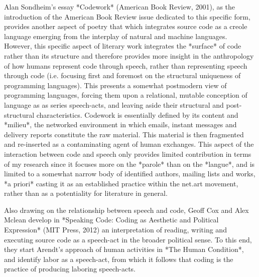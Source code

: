 Alan Sondheim's essay *Codework* (American Book Review, 2001), as the introduction of the American Book Review issue dedicated to this specific form, provides another aspect of poetry that which integrates source code as a creole language emerging from the interplay of natural and machine languages. However, this specific aspect of literary work integrates the *surface* of code rather than its structure and therefore provides more insight in the anthropology of how humans represent code through speech, rather than representing speech through code (i.e. focusing first and foremost on the structural uniqueness of programming languages). This presents a somewhat postmodern view of programming languages, forcing them upon a relational, mutable conception of language as as series speech-acts, and leaving aside their structural and post-structural characteristics. Codework is essentially defined by its content and *milieu*, the networked environment in which emails, instant messages and delivery reports constitute the raw material. This material is then fragmented and re-inserted as a contaminating agent of human exchanges. This aspect of the interaction between code and speech only provides limited contribution in terms of my research since it focuses more on the *parole* than on the *langue*, and is limited to a somewhat narrow body of identified authors, mailing lists and works, *a priori* casting it as an established practice within the net.art movement, rather than as a potentiality for literature in general.

Also drawing on the relationship between speech and code, Geoff Cox and Alex Mclean develop in *Speaking Code: Coding as Aesthetic and Political Expression* (MIT Press, 2012) an interpretation of reading, writing and executing source code as a speech-act in the broader political sense. To this end, they start Arendt's approach of human activities in *The Human Condition*, and identify labor as a speech-act, from which it follows that coding is the practice of producing laboring speech-acts.

